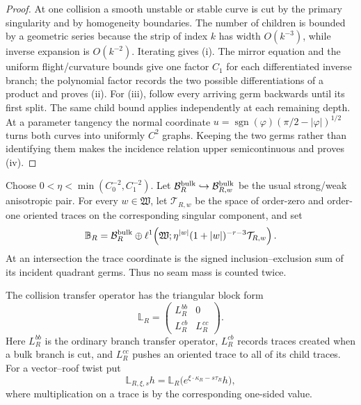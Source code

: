 \begin{proof}
At one collision a smooth unstable or stable curve is cut by the primary
singularity and by homogeneity boundaries.  The number of children is bounded
by a geometric series because the strip of index \(k\) has width
\(O(k^{-3})\), while inverse expansion is \(O(k^{-2})\).  Iterating gives
(i).  The mirror equation and the uniform flight/curvature bounds give one
factor \(C_1\) for each differentiated inverse branch; the polynomial factor
records the two possible differentiations of a product and proves (ii).
For (iii), follow every arriving germ backwards until its first split.  The
same child bound applies independently at each remaining depth.  At a
parameter tangency the normal coordinate
\(u=\operatorname{sgn}(\varphi)(\pi/2-|\varphi|)^{1/2}\) turns both curves
into uniformly \(C^2\) graphs.  Keeping the two germs rather than identifying
them makes the incidence relation upper semicontinuous and proves (iv).
\end{proof}

Choose \(0<\eta<\min(C_0^{-2},C_1^{-2})\).  Let
\(\mathcal B_R^{\rm bulk}\hookrightarrow\mathcal B_{R,w}^{\rm bulk}\) be the
usual strong/weak anisotropic pair.  For every \(w\in\mathfrak W\), let
\(\mathcal T_{R,w}\) be the space of order-zero and order-one oriented traces
on the corresponding singular component, and set
\[
 \mathbb B_R=
 \mathcal B_R^{\rm bulk}\oplus
 \ell^1\!\left(\mathfrak W;
   \eta^{|w|}(1+|w|)^{-r-3}\mathcal T_{R,w}\right).
\]
At an intersection the trace coordinate is the signed inclusion--exclusion
sum of its incident quadrant germs.  Thus no seam mass is counted twice.

The collision transfer operator has the triangular block form
\[
 \mathbb L_R=
 \begin{pmatrix}
  L_R^{bb}&0\\
  L_R^{cb}&L_R^{cc}
 \end{pmatrix}.
\]
Here \(L_R^{bb}\) is the ordinary branch transfer operator,
\(L_R^{cb}\) records traces created when a bulk branch is cut, and
\(L_R^{cc}\) pushes an oriented trace to all of its child traces.  For a
vector--roof twist put
\[
 \mathbb L_{R,\xi,s}h
 =\mathbb L_R\bigl(e^{\xi\cdot\kappa_R-s\tau_R}h\bigr),
\]
where multiplication on a trace is by the corresponding one-sided value.

